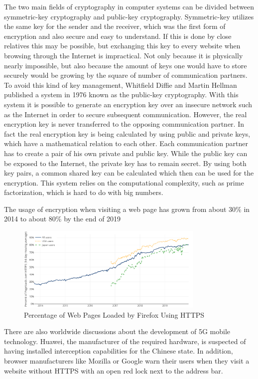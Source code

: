 \documentclass[12pt,oneside,a4paper,parskip]{scrbook}
\begin{document}
The two main fields of cryptography in computer systems can be divided between symmetric-key cryptography and public-key cryptography. Symmetric-key utilizes the same key for the sender and the receiver, which was the first form of encryption and also secure and easy to understand. If this is done by close relatives this may be possible, but exchanging this key to every website when browsing through the Internet is impractical. Not only because it is physically nearly impossible, but also because the amount of keys one would have to store securely would be growing by the square of number of communication partners.
To avoid this kind of key management, Whitfield Diffie and Martin Hellman published a system in 1976 known as the public-key cryptography. With this system it is possible to generate an encryption key over an insecure network such as the Internet in order to secure subsequent communication. However, the real encryption key is never transferred to the opposing communication partner. In fact the real encryption key is being calculated by using public and private keys, which have a mathematical relation to each other. Each communication partner has to create a pair of his own private and public key. While the public key can be exposed to the Internet, the private key has to remain secret. 
By using both key pairs, a common shared key can be calculated which then can be used for the encryption. This system relies on the computational complexity, such as prime factorization, which is hard to do with big numbers. 

The usage of encryption when visiting a web page has grown from about 30\% in 2014 to about 80\% by the end of 2019

\begin{figure}[ht]
	\centering
  \includegraphics[width=0.8\textwidth]{ressources/https_statistics.png}
	\caption{Percentage of Web Pages Loaded by Firefox Using HTTPS \parencite{letsencrypt_lets_2019}}
\end{figure}
\newpage
There are also worldwide discussions about the development of 5G mobile technology. Huawei, the manufacturer of the required hardware, is suspected of having installed interception capabilities for the Chinese state. \parencite{stokel-walker_banning_2019} \newline
In addition, browser manufacturers like Mozilla or Google warn their users when they visit a website without HTTPS with an open red lock next to the address bar. \parencite{google_milestone_2018}
\end{document}
